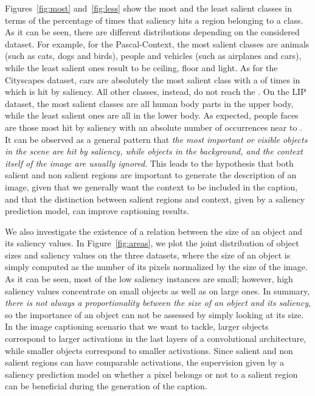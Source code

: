 Figures~\ref{fig:most} and~\ref{fig:less} show the most and the least salient classes in terms of the percentage of times that saliency hits a region belonging to a class. As it can be seen, there are different distributions depending on the considered dataset. For example, for the Pascal-Context, the most salient classes are animals (such as cats, dogs and birds), people and vehicles (such as airplanes and cars), while the least salient ones result to be ceiling, floor and light. As for the Cityscapes dataset, cars are absolutely the most salient class with a  of times in which is hit by saliency. All other classes, instead, do not reach the . On the LIP dataset, the most salient classes are all human body parts in the upper body, while the least salient ones are all in the lower body. As expected, people faces are those most hit by saliency with an absolute number of occurrences near to . It can be observed as a general pattern that \emph{the most important or visible objects in the scene are hit by saliency, while objects in the background, and the context itself of the image are usually ignored}. This leads to the hypothesis that both salient and non salient regions are important to generate the description of an image, given that we generally want the context to be included in the caption, and that the distinction between salient regions and context, given by a saliency prediction model, can improve captioning results.

We also investigate the existence of a relation between the size of an object and its saliency values. In Figure~\ref{fig:areas}, we plot the joint distribution of object sizes and saliency values on the three datasets, where the size of an object is simply computed as the number of its pixels normalized by the size of the image. As it can be seen, most of the low saliency instances are small; however, high saliency values concentrate on small objects as well as on large ones. In summary, \emph{there is not always a proportionality between the size of an object and its saliency}, so the importance of an object can not be assessed by simply looking at its size. In the image captioning scenario that we want to tackle, larger objects correspond to larger activations in the last layers of a convolutional architecture, while smaller objects correspond to smaller activations. Since salient and non salient regions can have comparable activations, the supervision given by a saliency prediction model on whether a pixel belongs or not to a salient region can be beneficial during the generation of the caption.

